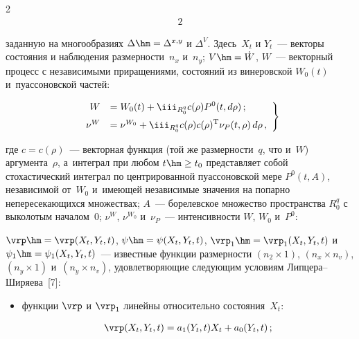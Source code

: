 \begin{multicols}{2}
\begin{alignat}{2}
   \end{alignat}

заданную на многообразиях $\Delta \hm= \Delta^{x,y}$ и $\Delta^V$. Здесь~$X_t$ и $Y_t$~--- векторы состояния и наблюдения размерности~$n_x$ и~$n_y$; $V\hm= \dot W$, $W$~--- векторный процесс с независимыми приращениями, состояний из винеровской $W_0(t)$ и~пуассоновской частей:

    \begin{equation}

     \left.

     \begin{array}{rl}

     W&= W_0 (t) +\displaystyle \iii_{R_0^q} c(\rho) P^0 (t, d\rho)\,;\\[6pt]

     \nu^W &= \nu^{W_0} + \displaystyle \iii_{R_0^q} c(\rho) c(\rho)^{\mathrm{T}} \nu_P (t, \rho)\, d\rho\,,

     \end{array}

     \right\}

     \label{e3-sin}

     \end{equation}

где $c=c(\rho)$~--- векторная функция (той же размерности~$q$, что и~$W$) аргумента~$\rho$, а~интеграл при любом $t\hm\ge t_0$ представляет собой стохастический интеграл по центрированной пуассоновской мере  $P^0 (t, A)$, независимой от~$W_0$  и~име\-ющей независимые значения на попарно непересекающихся множествах;  $A$~--- борелевское множество пространства $R_0^q$ с выколотым началом~$0$; $\nu^W$, $\nu^{W_0}$ и~$\nu_P$~--- интенсивности $W$, $W_0$ и~$P^0$:

$\vrp\hm=\vrp (X_t, Y_t, t)$, $\psi\hm=\psi (X_t, Y_t, t)$, $\vrp_1\hm=\vrp_1 (X_t, Y_t, t)$ и~$\psi_1\hm=\psi_1 (X_t, Y_t, t)$~--- известные функции раз\-мер\-ности $(n_2\times 1)$, $(n_x\times n_v)$, $(n_y \times 1)$ и~$(n_y\times n_v)$, удовлетворяющие следующим условиям Лип\-це\-ра--Ши\-ря\-ева~[7]:

\begin{itemize}

\item  функции $\vrp$ и $\vrp_1$ линейны относительно состояния~$X_t$:

    \begin{align*}

    \vrp (X_t, Y_t, t) &= a_1 (Y_t, t) X_t + a_0 (Y_t, t)\,;\\


\end{align*}
\end{itemize}
\end{multicols}
